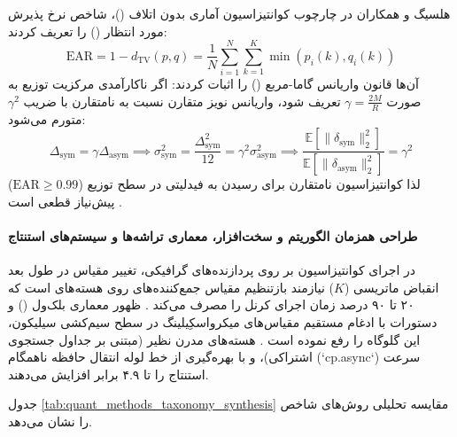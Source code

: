 هلسیگ و همکاران \cite{helcig2026statistically} در چارچوب کوانتیزاسیون آماری بدون اتلاف ()، شاخص نرخ پذیرش مورد انتظار () را تعریف کردند:
\begin{equation}
    \mathrm{EAR} = 1 - d_{\mathrm{TV}}(p, q) = \frac{1}{N} \sum_{i=1}^N \sum_{k=1}^K \min(p_i(k), q_i(k))
\end{equation}
آن‌ها قانون واریانس گاما-مربع () را اثبات کردند: اگر ناکارآمدی مرکزیت توزیع به صورت $\gamma = \frac{2M}{R}$ تعریف شود، واریانس نویز متقارن نسبت به نامتقارن با ضریب $\gamma^2$ متورم می‌شود:
\begin{equation}
    \Delta_{\text{sym}} = \gamma \Delta_{\text{asym}} \implies \sigma_{\text{sym}}^2 = \frac{\Delta_{\text{sym}}^2}{12} = \gamma^2 \sigma_{\text{asym}}^2 \implies \frac{\mathbb{E}[\|\delta_{\text{sym}}\|_2^2]}{\mathbb{E}[\|\delta_{\text{asym}}\|_2^2]} = \gamma^2
\end{equation}
لذا کوانتیزاسیون نامتقارن برای رسیدن به فیدلیتی در سطح توزیع ($\mathrm{EAR} \ge 0.99$) پیش‌نیاز قطعی است \cite{helcig2026statistically}.

\paragraph*{طراحی همزمان الگوریتم و سخت‌افزار، معماری تراشه‌ها و سیستم‌های استنتاج}
در اجرای کوانتیزاسیون  بر روی پردازنده‌های گرافیکی، تغییر مقیاس در طول بعد انقباض ماتریسی ($K$) نیازمند بازتنظیم مقیاس جمع‌کننده‌های  روی هسته‌های  است که ۲۰ تا ۹۰ درصد زمان اجرای کرنل را مصرف می‌کند \cite{jokar2026transforms}. ظهور معماری بلک‌ول () و دستورات  با ادغام مستقیم مقیاس‌های میکرواسکِیلینگ در سطح سیم‌کشی سیلیکون، این گلوگاه را رفع نموده است \cite{jokar2026transforms}. هسته‌های مدرن نظیر  \cite{guo2024flute} (مبتنی بر جداول جستجوی اشتراکی)،  \cite{frantar2025marlin} و  \cite{vaidhya2025spectra} با بهره‌گیری از خط لوله انتقال حافظه ناهمگام (`cp.async`) سرعت استنتاج را تا ۴.۹ برابر افزایش می‌دهند.

جدول \ref{tab:quant_methods_taxonomy_synthesis} مقایسه تحلیلی روش‌های شاخص را نشان می‌دهد.

